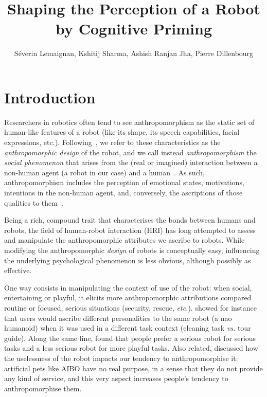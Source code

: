 \documentclass[lettersize, noapacite, twoside, HRI]{apa_HRI}
\title{Shaping the Perception of a Robot by Cognitive Priming}
\author{S\'everin Lemaignan, Kshitij Sharma, Ashish Ranjan Jha, Pierre
Dillenbourg}
\affiliation{CHILI Lab, \'Ecole Polytechnique F\'ed\'erale de Lausanne}
\newcommand{\etc}{\textit{etc.}\xspace}
\newcommand{\vs}{\textit{vs.}\xspace}
\begin{document}
\maketitle

\section{Introduction}

Researchers in robotics often tend to see anthropomorphism as the static set of
human-like features of a robot (like its shape, its speech capabilities, facial
expressions, etc.). Following~\citet{fink_anthropomorphism_2012}, we refer to
these characteristics as the \emph{anthropomorphic design} of the robot, and we
call instead \emph{anthropomorphism} the \emph{social phenomenon} that arises
from the (real or imagined) interaction between a non-human agent (a robot in
our case) and a human~\citep{persson_anthropomorphism_2000}. As such,
anthropomorphism includes the perception of emotional states, motivations,
intentions in the non-human agent, and, conversely, the ascriptions of those
qualities to them~\citep{epley_when_2008}.

Being a rich, compound trait that characterises the bonds between humans
and robots, the field of human-robot interaction (HRI) has long
attempted to assess and manipulate the anthropomorphic attributes we ascribe to robots.
While modifying the anthropomorphic \emph{design} of robots is conceptually
easy, influencing the underlying psychological phenomenon is less
obvious, although possibly as effective.

One way consists in manipulating the context of use of the robot: when social,
entertaining or playful, it elicits more anthropomorphic attributions compared
routine or focused, serious situations (security, rescue, \etc).
\citet{joosse_what_2013} showed for instance that users would ascribe
different personalities to the same robot (a {\sc nao} humanoid) when it was
used in a different task context (cleaning task \vs tour guide). Along the same
line, \citet{goetz_cooperation_2002} found that people prefer a serious robot
for serious tasks and a less serious robot for more playful tasks. Also related,
\citet{kaplan_free_2000} discussed how the uselessness of the robot impacts our
tendency to anthropomorphise it: artificial pets like AIBO have no real purpose,
in a sense that they do not provide any kind of service, and this very aspect
increases people's tendency to anthropomorphise them.
\end{document}
